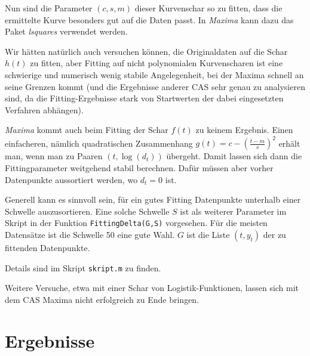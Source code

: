\documentclass[a4paper,11pt]{article}
\newcommand{\br}[1]{\left(#1\right)}
\begin{document}
Nun sind die Parameter $(c,s,m)$ dieser Kurvenschar so zu fitten, dass die
ermittelte Kurve besonders gut auf die Daten passt.  In \emph{Maxima} kann
dazu das Paket \emph{lsquares} verwendet werden.  

Wir hätten natürlich auch versuchen können, die Originaldaten auf die Schar
$h(t)$ zu fitten, aber Fitting auf nicht polynomialen Kurvenscharen ist eine
schwierige und numerisch wenig stabile Angelegenheit, bei der Maxima schnell
an seine Grenzen kommt (und die Ergebnisse anderer CAS sehr genau zu
analysieren sind, da die Fitting-Ergebnisse stark von Startwerten der dabei
eingesetzten Verfahren abhängen).

\emph{Maxima} kommt auch beim Fitting der Schar $f(t)$ zu keinem Ergebnis.
Einen einfacheren, nämlich quadratischen Zusammenhang
$g(t)=c-\br{\frac{t-m}{s}}^2$ erhält man, wenn man zu Paaren $(t,\log(d_t))$
übergeht.  Damit lassen sich dann die Fittingparameter weitgehend stabil
berechnen. Dafür müssen aber vorher Datenpunkte aussortiert werden, wo $d_t=0$
ist.

Generell kann es sinnvoll sein, für ein gutes Fitting Datenpunkte unterhalb
einer Schwelle auszusortieren. Eine solche Schwelle $S$ ist als weiterer
Parameter im Skript in der Funktion \texttt{FittingDelta(G,S)} vorgesehen. Für
die meisten Datensätze ist die Schwelle 50 eine gute Wahl. $G$ ist die Liste
$(t,y_t)$ der zu fittenden Datenpunkte.

Details sind im Skript \texttt{skript.m} zu finden.

Weitere Versuche, etwa mit einer Schar von Logistik-Funktionen, lassen sich
mit dem CAS Maxima nicht erfolgreich zu Ende bringen. 

\section{Ergebnisse}
\end{document}
